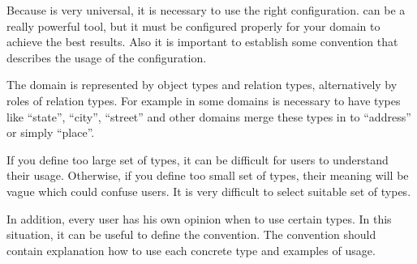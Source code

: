 
Because \textan{} is very universal, it is necessary to use the right
configuration. \textan can be a really powerful tool, but it must be
configured properly for your domain to achieve the best results. Also it is
important to establish some convention that describes the usage of the
configuration.

The domain is represented by object types and relation types, alternatively by
roles of relation types. For example in some domains is necessary to have types
like ``state'', ``city'', ``street'' and other domains merge these types in to
``address'' or simply ``place''.

If you define too large set of types, it can be difficult for users to understand
their usage. Otherwise, if you define too small set of types, their meaning will
be vague which could confuse users. It is very difficult to select suitable set
of types.

In addition, every user has his own opinion when to use certain types. In this
situation, it can be useful to define the convention. The convention should
contain explanation how to use each concrete type and examples of usage.
